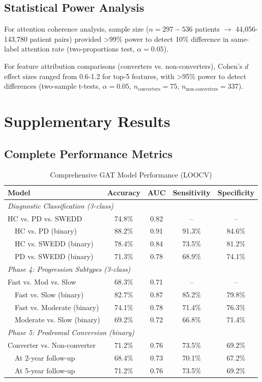\documentclass[11pt]{article}
\begin{document}
\subsection{Statistical Power Analysis}

For attention coherence analysis, sample size ($n=297-536$ patients $\to$ 44,056-143,780 patient pairs) provided >99\% power to detect 10\% difference in same-label attention rate (two-proportions test, $\alpha=0.05$).

For feature attribution comparisons (converters vs. non-converters), Cohen's $d$ effect sizes ranged from 0.6-1.2 for top-5 features, with >95\% power to detect differences (two-sample t-tests, $\alpha=0.05$, $n_{\text{converters}}=75$, $n_{\text{non-converters}}=337$).

\newpage
\section{Supplementary Results}

\subsection{Complete Performance Metrics}

\begin{table}[H]
\centering
\caption{Comprehensive GAT Model Performance (LOOCV)}
\label{tab:supp_performance_full}
\begin{tabular}{lcccc}
\toprule
\textbf{Model} & \textbf{Accuracy} & \textbf{AUC} & \textbf{Sensitivity} & \textbf{Specificity} \\
\midrule
\multicolumn{5}{l}{\textit{Diagnostic Classification (3-class)}} \\
HC vs. PD vs. SWEDD & 74.8\% & 0.82 & -- & -- \\
\ \ HC vs. PD (binary) & 88.2\% & 0.91 & 91.3\% & 84.6\% \\
\ \ HC vs. SWEDD (binary) & 78.4\% & 0.84 & 73.5\% & 81.2\% \\
\ \ PD vs. SWEDD (binary) & 71.3\% & 0.78 & 68.9\% & 74.1\% \\
\midrule
\multicolumn{5}{l}{\textit{Phase 4: Progression Subtypes (3-class)}} \\
Fast vs. Mod vs. Slow & 68.3\% & 0.71 & -- & -- \\
\ \ Fast vs. Slow (binary) & 82.7\% & 0.87 & 85.2\% & 79.8\% \\
\ \ Fast vs. Moderate (binary) & 74.1\% & 0.78 & 71.4\% & 76.3\% \\
\ \ Moderate vs. Slow (binary) & 69.2\% & 0.72 & 66.8\% & 71.4\% \\
\midrule
\multicolumn{5}{l}{\textit{Phase 5: Prodromal Conversion (binary)}} \\
Converter vs. Non-converter & 71.2\% & 0.76 & 73.5\% & 69.2\% \\
\ \ At 2-year follow-up & 68.4\% & 0.73 & 70.1\% & 67.2\% \\
\ \ At 5-year follow-up & 71.2\% & 0.76 & 73.5\% & 69.2\% \\
\bottomrule
\end{tabular}
\end{table}
\end{document}
